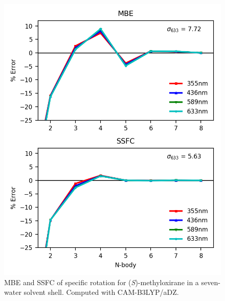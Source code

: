     \begin{figure}
        \centering
        \includegraphics[scale=0.75]{p1/graphs/si/metox_7_cam_rot.png}
        \caption{MBE and SSFC of specific rotation for (\textit{S})-methyloxirane in a seven-water solvent shell. Computed with CAM-B3LYP/aDZ.}
        \label{metox_7_cam_rot}
    \end{figure}

